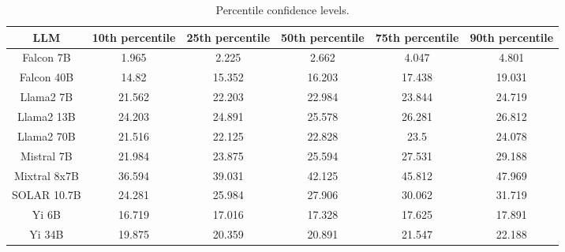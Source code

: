 \begin{table*}
\centering
\begin{tabular}{c|c|c|c|c|c}
LLM & 10th percentile & 25th percentile & 50th percentile & 75th percentile & 90th percentile\\ \hline
Falcon 7B & 1.965 & 2.225 & 2.662 & 4.047 & 4.801\\
Falcon 40B & 14.82 & 15.352 & 16.203 & 17.438 & 19.031\\
Llama2 7B & 21.562 & 22.203 & 22.984 & 23.844 & 24.719\\
Llama2 13B & 24.203 & 24.891 & 25.578 & 26.281 & 26.812\\
Llama2 70B & 21.516 & 22.125 & 22.828 & 23.5 & 24.078\\
Mistral 7B & 21.984 & 23.875 & 25.594 & 27.531 & 29.188\\
Mixtral 8x7B & 36.594 & 39.031 & 42.125 & 45.812 & 47.969\\
SOLAR 10.7B & 24.281 & 25.984 & 27.906 & 30.062 & 31.719\\
Yi 6B & 16.719 & 17.016 & 17.328 & 17.625 & 17.891\\
Yi 34B & 19.875 & 20.359 & 20.891 & 21.547 & 22.188\\
\hline
\end{tabular}
\caption{Percentile confidence levels.}
\label{tab:percentile_conf}
\end{table*}
